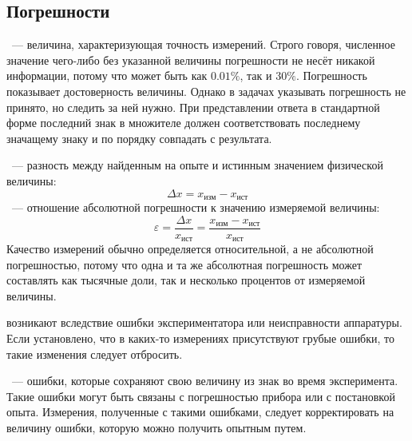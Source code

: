 \subsection{Погрешности}
~--- величина, характеризующая точность измерений. Строго говоря, численное значение чего-либо без указанной величины погрешности не несёт никакой информации, потому что  может быть как $0.01\%$, так и $30\%$. Погрешность показывает достоверность величины. Однако в задачах указывать погрешность не принято, но следить за ней нужно. При представлении ответа в стандартной форме последний знак в множителе должен соответствовать последнему значащему знаку и по порядку совпадать с  результата.

~--- разность между найденным на опыте и истинным значением физической величины:
\begin{equation}
\Delta x = x_\text{изм} - x_\text{ист}
\end{equation}
~--- отношение абсолютной погрешности к значению измеряемой величины:
\begin{equation}
\varepsilon = \frac{\Delta x}{x_\text{ист}} = \frac{x_\text{изм} - x_\text{ист}}{x_\text{ист}}
\end{equation}
Качество измерений обычно определяется относительной, а не абсолютной погрешностью, потому что одна и та же абсолютная погрешность может составлять как тысячные доли, так и несколько процентов от измеряемой величины.

 возникают вследствие ошибки экспериментатора или неисправности аппаратуры. Если установлено, что в каких-то измерениях присутствуют грубые ошибки, то такие изменения следует отбросить.

~--- ошибки, которые сохраняют свою величину из знак во время эксперимента. Такие ошибки могут быть связаны с погрешностью прибора или с постановкой опыта. Измерения, полученные с такими ошибками, следует корректировать на величину ошибки, которую можно получить опытным путем.


